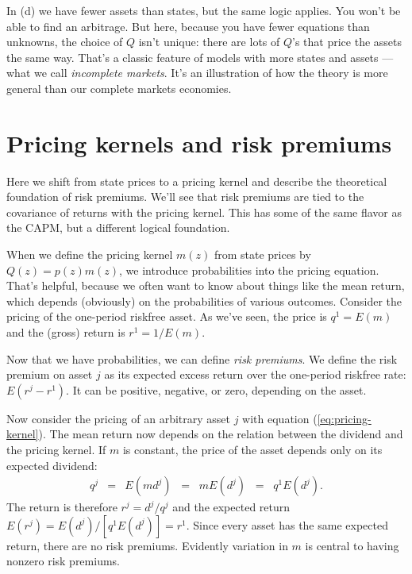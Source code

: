 \documentclass[11pt]{article}
\begin{document}
In (d) we have fewer assets than states, but the same logic applies.
You won't be able to find an arbitrage.
But here, because you have fewer equations than unknowns,
the choice of $Q$ isn't unique:
there are lots of $Q$'s that price the assets the same way.
That's a classic feature of models with more states and assets ---
what we call {\it incomplete markets\/}.
It's an illustration of how the theory is more general than our complete
markets economies.



\section{Pricing kernels and risk premiums}

Here we shift from state prices to a pricing kernel
and describe the theoretical foundation of risk premiums.
We'll see that risk premiums are tied to the covariance of returns with the pricing kernel.
This has some of the same flavor as the CAPM, but a different logical foundation.


When we define the pricing kernel $m(z)$ from state prices by $Q(z) = p(z) m(z)$,
we introduce probabilities into the pricing equation.
That's helpful, because we often want to know about things like the mean
return, which depends (obviously) on the probabilities of various outcomes.
Consider the pricing of the one-period riskfree asset.
As we've seen, the price is $q^1 = E(m)$ and the (gross) return is $r^1 = 1/E(m)$.

Now that we have probabilities, we can define {\it risk premiums\/}.
We define the risk premium on asset $j$ as its expected excess return
over the one-period riskfree rate:
$ E(r^j - r^1)$.
It can be positive, negative, or zero, depending on the asset.

Now consider the pricing of an arbitrary asset $j$ with equation (\ref{eq:pricing-kernel}).
The mean return now depends on the relation between the dividend and the pricing kernel.
If $m$ is constant, the price of the asset depends only on its expected dividend:
\begin{eqnarray*}
    q^j &=& E (m d^j) \;\;=\;\; m E(d^j) \;\;=\;\; q^1 E(d^j) .
\end{eqnarray*}
The return is therefore
$r^j = d^j/q^j$ and the expected return $E(r^j) = E(d^j)/[q^1 E(d^j)] = r^1$.
Since every asset has the same expected return, there are no risk premiums.
Evidently variation in $m$ is central to having nonzero risk premiums.
\end{document}
